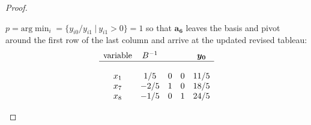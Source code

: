 \documentclass[12pt]{article}
\theoremstyle{definition}
\newcommand{\vect}[1]{\boldsymbol{#1}}
\begin{document}
\begin{proof}
\begin{enumerate}
      $p = \text{arg}\min_i = \{y_{i0} / y_{i1} \ | \ y_{i1} > 0\} = 1$ so that $\vect{a_6}$
      leaves the basis and pivot
      around the first row of the last column and arrive at the updated revised tableau:
      \begin{align*}
        \begin{matrix}
          \text{variable} & B^{-1} & & & \vect{y_0}\\
          \hline \\
          x_1 & 1/5 & 0 & 0 & 11/5 \\
          x_7 & -2/5 & 1 & 0 & 18/5\\
          x_8 & -1/5 & 0 & 1 & 24/5\\
        \end{matrix}
      \end{align*}


\end{enumerate}
\end{proof}
\end{document}
